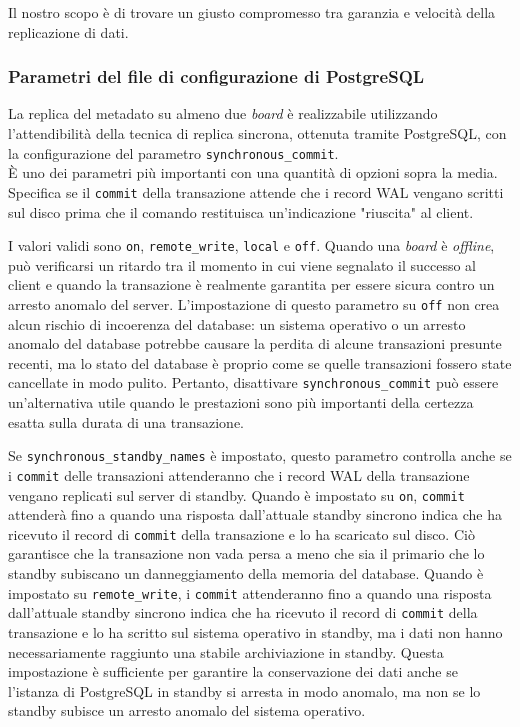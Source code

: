 Il nostro scopo \`{e} di trovare un giusto compromesso tra garanzia e velocit\`{a} della replicazione di dati.

\subsubsection{Parametri del file di configurazione di PostgreSQL}
La replica del metadato su almeno due \textit{board} \`{e} realizzabile utilizzando l'attendibilit\`{a} della tecnica di replica sincrona, ottenuta tramite PostgreSQL, con la configurazione del parametro \verb"synchronous_commit".\\
\`{E} uno dei parametri pi\`{u} importanti con una quantit\`{a} di opzioni sopra la media. Specifica se il \verb"commit" della transazione attende che i record WAL vengano scritti sul disco prima che il comando restituisca un'indicazione "riuscita" al client. 

I valori validi sono \verb"on", \verb"remote_write", \verb"local" e \verb"off". Quando una \textit{board} \`{e} \textit{offline}, pu\`{o} verificarsi un ritardo tra il momento in cui viene segnalato il successo al client e quando la transazione \`{e} realmente garantita per essere sicura contro un arresto anomalo del server. 
L'impostazione di questo parametro su \verb"off" non crea alcun rischio di incoerenza del database: un sistema operativo o un arresto anomalo del database potrebbe causare la perdita di alcune transazioni presunte recenti, ma lo stato del database \`{e} proprio come se quelle transazioni fossero state cancellate in modo pulito. Pertanto, disattivare \verb"synchronous_commit" pu\`{o} essere un'alternativa utile quando le prestazioni sono pi\`{u} importanti della certezza esatta sulla durata di una transazione.\cite{etichetta12}

Se \verb"synchronous_standby_names" \`{e} impostato, questo parametro controlla anche se i \verb"commit" delle transazioni attenderanno che i record WAL della transazione vengano replicati sul server di standby. Quando \`{e} impostato su \verb"on", \verb"commit" attender\`{a} fino a quando una risposta dall'attuale standby sincrono indica che ha ricevuto il record di \verb"commit" della transazione e lo ha scaricato sul disco. Ci\`{o} garantisce che la transazione non vada persa a meno che sia il primario che lo standby subiscano un danneggiamento della memoria del database. Quando \`{e} impostato su \verb"remote_write", i \verb"commit" attenderanno fino a quando una risposta dall'attuale standby sincrono indica che ha ricevuto il record di \verb"commit" della transazione e lo ha scritto sul sistema operativo in standby, ma i dati non hanno necessariamente raggiunto una stabile archiviazione in standby. Questa impostazione \`{e} sufficiente per garantire la conservazione dei dati anche se l'istanza di PostgreSQL in standby si arresta in modo anomalo, ma non se lo standby subisce un arresto anomalo del sistema operativo.

